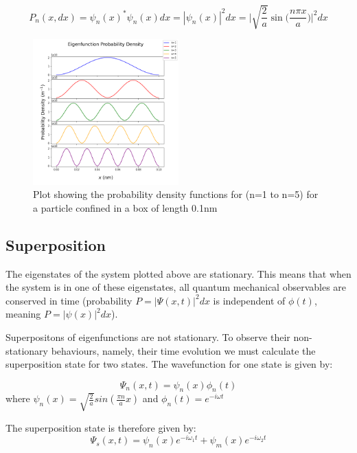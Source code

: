 $$P_n(x,dx) =\psi_n (x)^{*}\psi_n (x)dx =|\psi_n(x)|^{2}dx = \Bigg|\sqrt{\frac{2}{a}}\sin\Big(\frac{n\pi x}{a}\Big)\Bigg|^{2}dx  $$

\begin{figure}[H]
    \centering
    \includegraphics[width=0.5\textwidth]{lab1/images/probabilityDensity.png} %
    \captionsetup{font = it, labelfont = bf, width=.91\linewidth, justification=centering}
    \caption{Plot showing the probability density functions for (n=1 to n=5) for a particle confined in a box of length 0.1nm}
    \label{fig:probDens}
\end{figure}

\subsection{Superposition}

The eigenstates of the system plotted above are stationary. This means that when the system is in one of these eigenstates, all quantum mechanical observables are conserved in time (probability $P=|\Psi(x,t)|^2dx$ is independent of $\phi(t)$, meaning $P=|\psi(x)|^2dx$).

Superpositons of eigenfunctions are not stationary. To observe their non-stationary behaviours, namely, their time evolution we must calculate the superposition state for two states. The wavefunction for one state is given by:

$$\Psi_n (x,t) = \psi_n (x)\phi_n (t)$$
where $\psi_n (x)= \sqrt{\frac{2}{a}} sin(\frac{\pi n}{a}x)$ and $\phi_n (t)= e^{-i \omega t}$

The superposition state is therefore given by:
\begin{equation} \label{eq:superPos}
\Psi_s (x,t) = \psi_n (x)e^{-i \omega_{1} t} + \psi_m (x)e^{-i \omega_{2} t}
\end{equation}


